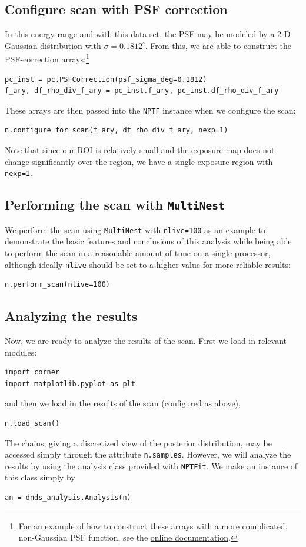 \subsection{Configure scan with PSF correction}
In this energy range and with this data set, the PSF may be modeled by a 2-D Gaussian distribution with $\sigma = 0.1812^\circ$.  From this, we are able to construct the PSF-correction arrays:\footnote{For an example of how to construct these arrays with a more complicated, non-Gaussian PSF function, see the \href{http://nptfit.readthedocs.io}{online documentation}.} 
\begin{lstlisting}
pc_inst = pc.PSFCorrection(psf_sigma_deg=0.1812)
f_ary, df_rho_div_f_ary = pc_inst.f_ary, pc_inst.df_rho_div_f_ary
\end{lstlisting}
These arrays are then passed into the \lstinline{NPTF} instance when we configure the scan:
\begin{lstlisting}
n.configure_for_scan(f_ary, df_rho_div_f_ary, nexp=1)
\end{lstlisting}
Note that since our ROI is relatively small and the exposure map does not change significantly over the region, we have a single exposure region with \lstinline{nexp=1}.

\subsection{Performing the scan with \texttt{MultiNest}}
We perform the scan using \texttt{MultiNest} with \lstinline{nlive=100} as an example to demonstrate the basic features and conclusions of this analysis while being able to perform the scan in a reasonable amount of time on a single processor, although ideally \lstinline{nlive} should be set to a higher value for more reliable results:
\begin{lstlisting}
n.perform_scan(nlive=100)
\end{lstlisting}

\subsection{Analyzing the results}
Now, we are ready to analyze the results of the scan.  First we load in relevant modules:
\begin{lstlisting}
import corner
import matplotlib.pyplot as plt
\end{lstlisting}
and then we load in the results of the scan (configured as above),
\begin{lstlisting}
n.load_scan()
\end{lstlisting}
The chains, giving a discretized view of the posterior distribution, may be accessed simply through the attribute \lstinline{n.samples}.  However, we will analyze the results by using the analysis class provided with \texttt{NPTFit}.  We make an instance of this class simply by
\begin{lstlisting}
an = dnds_analysis.Analysis(n)
\end{lstlisting}

